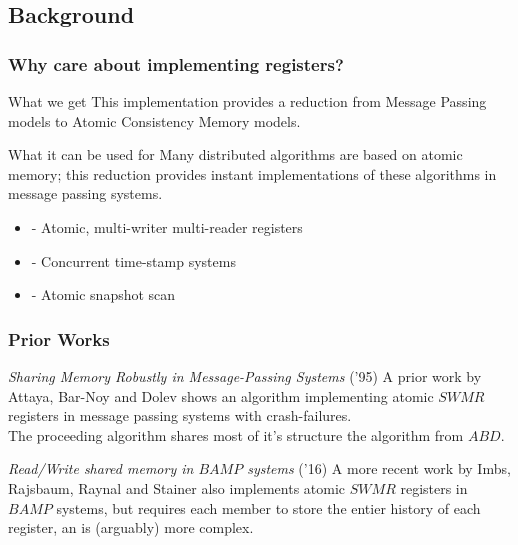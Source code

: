 \subsection{Background}
\begin{frame}
    \frametitle{Why care about implementing registers?}
    \begin{block}{What we get}
        This implementation provides a reduction from Message Passing models to Atomic Consistency Memory models.
    \end{block}
    \begin{block}{What it can be used for}
        Many distributed algorithms are based on atomic memory; this reduction provides instant implementations
        of these algorithms in message passing systems.
    \end{block}
    \begin{examples}
        \begin{itemize}
            \item - Atomic, multi-writer multi-reader registers 
            \item - Concurrent time-stamp systems
            \item - Atomic snapshot scan
        \end{itemize}
    \end{examples}
\end{frame}

\begin{frame}
    \frametitle{Prior Works}
    \begin{alertblock}{\emph{Sharing Memory Robustly in Message-Passing Systems} ('95)}
        A prior work by Attaya, Bar-Noy and Dolev shows
        an algorithm implementing atomic $SWMR$ registers in
        message passing systems with crash-failures.\\
        The proceeding algorithm shares most of
        it's structure the algorithm from $ABD$. 
    \end{alertblock}
    \begin{block}{
        \emph{Read/Write shared memory in $BAMP$ systems} ('16)}
        A more recent work by Imbs, Rajsbaum, Raynal and Stainer
        also implements atomic $SWMR$ registers in $BAMP$ systems, 
        but requires each member to store the entier history of
        each register, an is (arguably) more complex.
    \end{block}
\end{frame}

